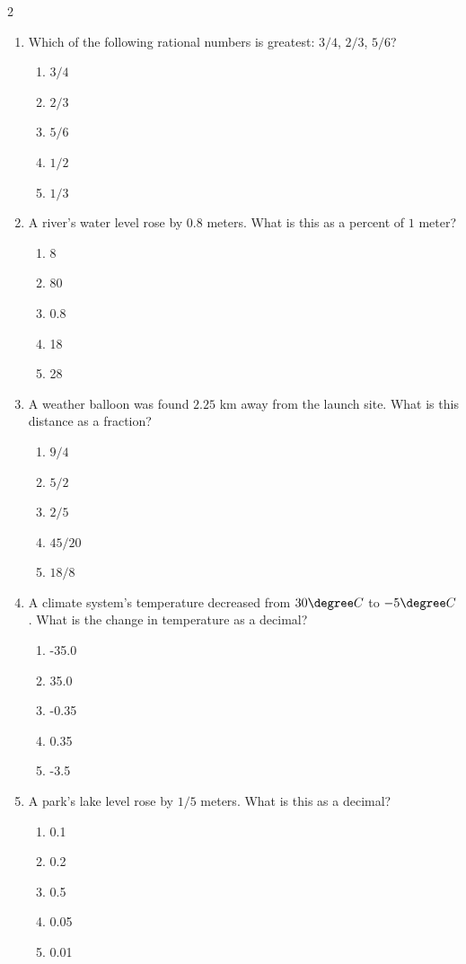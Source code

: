 \documentclass[10pt]{article}
\begin{document}
\begin{multicols}{2}
\begin{enumerate}[label=\textbf{Q\arabic*.}, leftmargin=*, itemsep=6pt, parsep=0pt]
  \item \small Which of the following rational numbers is greatest: $3/4$, $2/3$, $5/6$?
  \begin{enumerate}[label=(\Alph*), leftmargin=0.6cm, nosep, itemsep=2pt]
    \item $3/4$
    \item $2/3$
    \item $5/6$
    \item $1/2$
    \item $1/3$
  \end{enumerate}

  \item \small A river's water level rose by $0.8$ meters. What is this as a percent of $1$ meter?
  \begin{enumerate}[label=(\Alph*), leftmargin=0.6cm, nosep, itemsep=2pt]
    \item 8%
    \item 80%
    \item 0.8%
    \item 18%
    \item 28%
  \end{enumerate}

  \item \small A weather balloon was found $2.25$ km away from the launch site. What is this distance as a fraction?
  \begin{enumerate}[label=(\Alph*), leftmargin=0.6cm, nosep, itemsep=2pt]
    \item $9/4$
    \item $5/2$
    \item $2/5$
    \item $45/20$
    \item $18/8$
  \end{enumerate}

  \item \small A climate system's temperature decreased from $30\degree C$ to $-5\degree C$. What is the change in temperature as a decimal?
  \begin{enumerate}[label=(\Alph*), leftmargin=0.6cm, nosep, itemsep=2pt]
    \item -35.0
    \item 35.0
    \item -0.35
    \item 0.35
    \item -3.5
  \end{enumerate}

  \item \small A park's lake level rose by $1/5$ meters. What is this as a decimal?
  \begin{enumerate}[label=(\Alph*), leftmargin=0.6cm, nosep, itemsep=2pt]
    \item 0.1
    \item 0.2
    \item 0.5
    \item 0.05
    \item 0.01
  \end{enumerate}


\end{enumerate}
\end{multicols}
\end{document}
